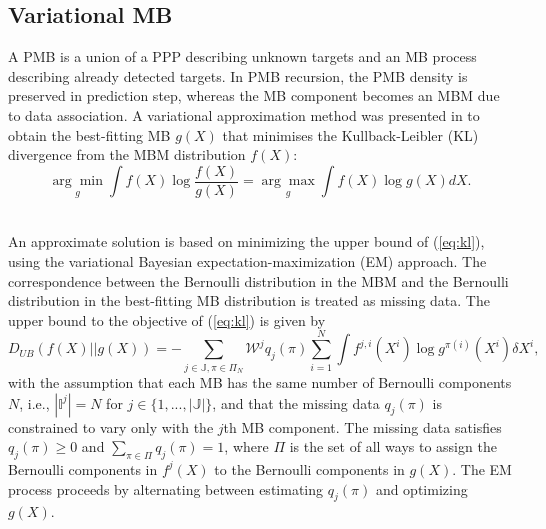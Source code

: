\subsection{Variational MB}
A PMB is a union of a PPP describing unknown targets and an MB process describing already detected targets. In PMB recursion, the PMB density is preserved in prediction step, whereas the MB component becomes an MBM due to data association. A variational approximation method was presented in \cite{variational} to obtain the best-fitting MB $g(X)$ that minimises the Kullback-Leibler (KL) divergence from the MBM distribution $f(X)$:
\begin{equation}
\underset{g}{\arg\min}\int f(X)\log\frac{f(X)}{g(X)} = \underset{g}{\arg\max}\int f(X)\log g(X)dX.
\label{eq:kl}
\end{equation}


~\\
An approximate solution is based on minimizing the upper bound of (\ref{eq:kl}), using the variational Bayesian expectation-maximization (EM) approach. The correspondence between the Bernoulli distribution in the MBM and the Bernoulli distribution in the best-fitting MB distribution is treated as missing data. The upper bound to the objective of (\ref{eq:kl}) is given by \cite{variational}
\begin{equation}
D_{UB}(f(X)||g(X))= -\sum_{j\in\mathbb{J},\pi\in\Pi_N}\mathcal{W}^jq_j(\pi)\sum_{i=1}^N\int f^{j,i}(X^i)\log g^{\pi(i)}(X^i)\delta X^i,
\end{equation}
with the assumption that each MB has the same number of Bernoulli components  $N$, i.e., $|\mathbb{I}^j|=N$ for $j\in\{1,...,|\mathbb{J}|\}$, and that the missing data $q_j(\pi)$ is constrained to vary only with the $j$th MB component. The missing data satisfies $q_j(\pi) \geq 0$ and $\sum_{\pi\in\Pi}q_j(\pi)=1$, where $\Pi$ is the set of all ways to assign the Bernoulli components in $f^j(X)$ to the Bernoulli components in $g(X)$. The EM process proceeds by alternating between estimating $q_j(\pi)$ and optimizing $g(X)$. 


